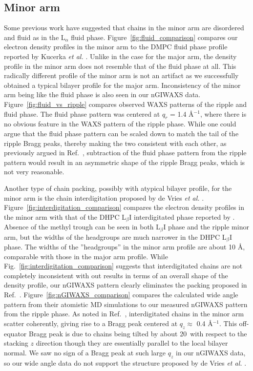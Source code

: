 \subsection{Minor arm}
Some previous work have suggested that chains in the minor arm are disordered 
and fluid as in the L$_\alpha$ fluid phase.
Figure~\ref{fig:fluid_comparison} compares our electron density profiles
in the minor arm to the DMPC fluid phase profile reported by 
Kucerka \textit{et al.} \cite{Kucerka05_BPJ}.
Unlike in the case for the major arm, the density profile in the minor arm
does not resemble that of the fluid phase at all. This radically different
profile of the minor arm is not an artifact as we successfully obtained 
a typical bilayer profile for the major arm.
Inconsistency of the minor arm being like the fluid phase is also seen in our nGIWAXS data.
Figure~\ref{fig:fluid_vs_ripple} compares observed WAXS patterns of the ripple and 
fluid phase. The fluid phase pattern was centered at $q_r$ = 1.4 \AA$^{-1}$, where
there is no obvious feature in the WAXS pattern of the ripple phase. While one
could argue that the fluid phase pattern can be scaled down to match the tail
of the ripple Bragg peaks, thereby making the two consistent with each other, 
as previously argued in Ref.~\cite{ref:Cunningham98}, 
subtraction of the fluid phase pattern from the ripple pattern would result
in an asymmetric shape of the ripple Bragg peaks, which is not very reasonable.

Another type of chain packing, possibly with atypical bilayer profile, for the minor arm 
is the chain interdigitation proposed by de Vries \textit{et al.} \cite{ref:deVries05}.
Figure~\ref{fig:interdigitation_comparison} compares the electron density
profiles in the minor arm with that of the DHPC L$_\beta\text{I}$ interdigitated phase
reported by \cite{ref:Guler09}. Absence of the methyl trough can be seen in
both L$_\beta\text{I}$ phase and the ripple minor arm, but the widths of the
headgroups are much narrower in the DHPC L$_\beta\text{I}$ phase. The widths
of the ''headgroups'' in the minor arm profile are about 10 \AA, comparable
with those in the major arm profile. While Fig.~\ref{fig:interdigitation_comparison}
suggests that interdigitated chains are not completely inconsistent with 
out results in terms of an overall shape of the density profile, 
our nGIWAXS pattern clearly eliminates the packing proposed in 
Ref.~\cite{ref:deVries05}. Figure~\ref{fig:nGIWAXS_comparison} compares
the calculated wide angle pattern from their atomistic MD simulations
to our measured nGIWAXS pattern from the ripple phase. As noted in
Ref.~\cite{ref:deVries05}, interdigitated chains in the minor arm scatter
coherently, giving rise to a Bragg peak centered at $q_z \approx$ 0.4 \AA$^{-1}$.
This off-equator Bragg peak is due to chains being tilted by about 20\textdegree\
with respect to the stacking $z$ direction though they
are essentially parallel to the local bilayer normal.
We saw no sign of a Bragg peak at such large $q_z$ in our nGIWAXS
data, so our wide angle data do not support the structure proposed by
de Vries \textit{et al.} \cite{ref:deVries05}.

